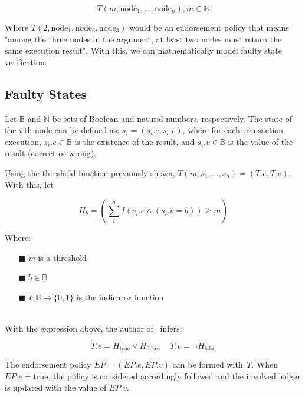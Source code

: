 \documentclass[sigconf, nonacm]{acmart}
\begin{document}
\begin{displaymath}
  T(m,\textrm{node}_1,... ,\textrm{node}_n), m \in \mathbb{N}
\end{displaymath}
\linebreak[1]

Where $T(2,\textrm{node}_1,\textrm{node}_2,\textrm{node}_3)$ would be an endorsement policy
that means "among the three nodes in the argument, at least two nodes must return the same execution result".
With this, we can mathematically model faulty state verification.

\subsection{Faulty States}
Let $\mathbb{B}$ and $\mathbb{N}$ be sets of Boolean and natural numbers, respectively. The state of the \textit{i}-th node can be defined as:
$s_i = (s_i.e,s_i.v)$, where for each transaction execution, $s_i.e \in \mathbb{B}$ is the  existence of the result,
and $s_i.v \in \mathbb{B}$ is the value of the result (correct or wrong).

Using the threshold function previously shown, $T(m,s_1,... ,s_n) = (T.e,T.v)$. With this, let

\begin{displaymath}
  H_b = \left(\sum_{i}^{n} I(s_i.e \wedge (s_i.v = b)) \geq m \right)
\end{displaymath}

Where:

\begin{enumerate}
  \item[$\blacksquare$] \textit{m} is a threshold
  \item[$\blacksquare$] $b \in \mathbb{B}$
  \item[$\blacksquare$] $I : \mathbb{B} \mapsto \{0,1\}$  is the indicator function
\end{enumerate}
\  \\ %

With the expression above, the author of~\cite{Kawahara2020} infers:

\begin{displaymath}
  T.e = H_{\textrm{true}} \vee H_{\textrm{false}}, \quad T.v = \neg{H_{\textrm{false}}}
\end{displaymath}
\linebreak[1]

The  endorsement policy $EP = (EP.e,EP.v)$ can be formed with \textit{T}. When $EP.e = \textrm{true}$, the policy
is considered accordingly followed and the involved ledger is updated with the value of $EP.v$.
\end{document}
